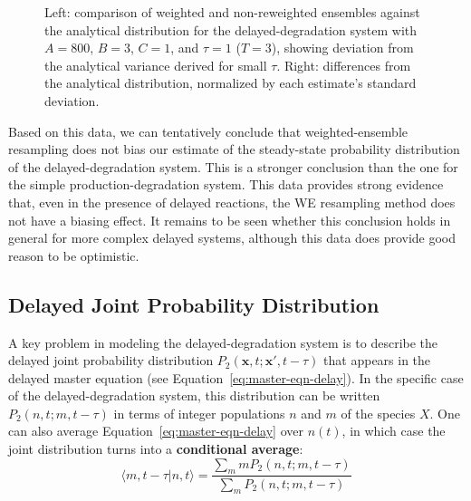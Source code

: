 \documentclass[english,letterpaper,12pt]{report}
\newcommand{\defkeywd}[1]{\textbf{#1}}
\renewcommand{\vec}[1]{\ensuremath{\mathbf{#1}}}
\begin{document}
\begin{doublespacing}
\begin{figure}[t]
    \makebox[\linewidth][c]{
        \begin{subfigure}{3in}
            \begin{center}
                
            \end{center}
            \label{sfg:ddwe1-comp}
        \end{subfigure}
        \begin{subfigure}{3in}
            \begin{center}
                
            \end{center}
            \label{sfg:ddwe1-chi}
        \end{subfigure}
    }
    \caption{Left: comparison of weighted and non-reweighted ensembles against the analytical distribution for the delayed-degradation system with $A=800$, $B=3$, $C=1$, and $\tau=1$ ($T=3$), showing deviation from the analytical variance derived for small $\tau$. Right: differences from the analytical distribution, normalized by each estimate's standard deviation.}
    \label{fig:ddwe1}
\end{figure}

Based on this data, we can tentatively conclude that weighted-ensemble resampling does not bias our estimate of the steady-state probability distribution of the delayed-degradation system. This is a stronger conclusion than the one for the simple production-degradation system. This data provides strong evidence that, even in the presence of delayed reactions, the WE resampling method does not have a biasing effect. It remains to be seen whether this conclusion holds in general for more complex delayed systems, although this data does provide good reason to be optimistic.


\subsection{Delayed Joint Probability Distribution} %
\label{sub:delayed-joint-dist}

A key problem in modeling the delayed-degradation system is to describe the delayed joint probability distribution $P_2(\vec{x}, t; \vec{x}', t - \tau)$ that appears in the delayed master equation (see Equation~\eqref{eq:master-eqn-delay}). In the specific case of the delayed-degradation system, this distribution can be written $P_2(n, t; m, t - \tau)$ in terms of integer populations $n$ and $m$ of the species $X$. One can also average Equation~\eqref{eq:master-eqn-delay} over $n(t)$, in which case the joint distribution turns into a \defkeywd{conditional average}:
\begin{equation}
    \langle m, t - \tau | n, t \rangle = \frac{\sum_m m P_2(n, t; m, t - \tau)}{\sum_m P_2(n, t; m, t - \tau) }
    \label{eq:cond-avg-def}
\end{equation}


\end{doublespacing}
\end{document}
